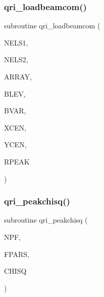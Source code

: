\subsubsection{\texorpdfstring{qri\+\_\+loadbeamcom()}{qri\_loadbeamcom()}}
{\footnotesize\ttfamily subroutine qri\+\_\+loadbeamcom (\begin{DoxyParamCaption}\item[{integer}]{N\+E\+L\+S1,  }\item[{integer}]{N\+E\+L\+S2,  }\item[{double precision, dimension(nels1,nels2)}]{A\+R\+R\+AY,  }\item[{double precision}]{B\+L\+EV,  }\item[{double precision}]{B\+V\+AR,  }\item[{double precision}]{X\+C\+EN,  }\item[{double precision}]{Y\+C\+EN,  }\item[{double precision}]{R\+P\+E\+AK }\end{DoxyParamCaption})}

\mbox{\label{qri__beam_8f_aa2a6569c86400d6eb961ced9a86562fd}} 
\subsubsection{\texorpdfstring{qri\+\_\+peakchisq()}{qri\_peakchisq()}}
{\footnotesize\ttfamily subroutine qri\+\_\+peakchisq (\begin{DoxyParamCaption}\item[{integer}]{N\+PF,  }\item[{double precision, dimension(npf)}]{F\+P\+A\+RS,  }\item[{double precision}]{C\+H\+I\+SQ }\end{DoxyParamCaption})}

\mbox{\label{qri__beam_8f_ae78196eb48587353d5378c6bd9b2fc06}} 
